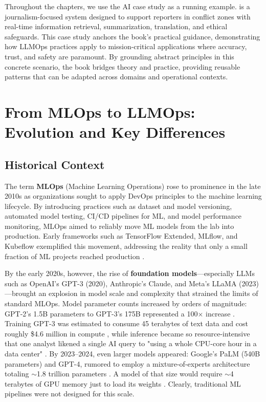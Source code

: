 Throughout the chapters, we use the \ishtar{} AI case study as a running example. \ishtar{} is a journalism-focused system designed to support reporters in conflict zones with real-time information retrieval, summarization, translation, and ethical safeguards. This case study anchors the book's practical guidance, demonstrating how LLMOps practices apply to mission-critical applications where accuracy, trust, and safety are paramount. By grounding abstract principles in this concrete scenario, the book bridges theory and practice, providing reusable patterns that can be adapted across domains and operational contexts.


\section{From MLOps to LLMOps: Evolution and Key Differences}
\label{sec:mlops-to-llmops}

\subsection*{Historical Context}
The term \textbf{MLOps} (Machine Learning Operations) rose to prominence in the late 2010s as organizations sought to apply DevOps principles to the machine learning lifecycle. By introducing practices such as dataset and model versioning, automated model testing, CI/CD pipelines for ML, and model performance monitoring, MLOps aimed to reliably move ML models from the lab into production. Early frameworks such as TensorFlow Extended, MLflow, and Kubeflow exemplified this movement, addressing the reality that only a small fraction of ML projects reached production \cite{mdpi}.

By the early 2020s, however, the rise of \textbf{foundation models}—especially LLMs such as OpenAI's GPT-3 (2020), Anthropic's Claude, and Meta's LLaMA (2023)—brought an explosion in model scale and complexity that strained the limits of standard MLOps. Model parameter counts increased by orders of magnitude: GPT-2's 1.5B parameters to GPT-3's 175B represented a 100$\times$ increase \cite{fiddler}. Training GPT-3 was estimated to consume 45 terabytes of text data and cost roughly \$4.6 million in compute \cite{lambda}, while inference became so resource-intensive that one analyst likened a single AI query to "using a whole CPU-core hour in a data center" \cite{fabricatedknowledge}. By 2023--2024, even larger models appeared: Google's PaLM (540B parameters) and GPT-4, rumored to employ a mixture-of-experts architecture totaling $\sim$1.8 trillion parameters \cite{explodingtopics}. A model of that size would require $\sim$4 terabytes of GPU memory just to load its weights \cite{fabricatedknowledge}. Clearly, traditional ML pipelines were not designed for this scale.

